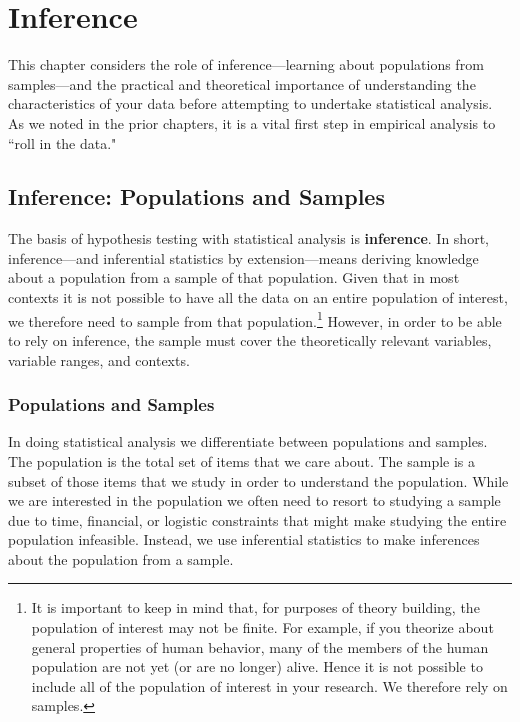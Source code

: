 \documentclass[11pt,openany]{book}\usepackage[]{graphicx}\usepackage[]{color}
\begin{document}
{\chapter{Inference}


This chapter considers the role of inference---learning about populations from samples---and the practical and theoretical importance of understanding the characteristics of your data before attempting to undertake statistical analysis. As we noted in the prior chapters, it is a vital first step in empirical analysis to ``roll in the data."

\section{Inference: Populations and Samples}

The basis of hypothesis testing with statistical analysis is \textbf{inference}. In short, inference---and inferential statistics by extension---means deriving knowledge about a population from a sample of that population. Given that in most contexts it is not possible to have all the data on an entire population of interest, we therefore need to sample from that population.\footnote{It is important to keep in mind that, for purposes of theory building, the population of interest may not be finite. For example, if you theorize about general properties of human behavior, many of the members of the human population are not yet (or are no longer) alive. Hence it is not possible to include all of the population of interest in your research. We therefore rely on samples.} However, in order to be able to rely on inference, the sample must cover the theoretically relevant variables, variable ranges, and contexts. 

\subsection{Populations and Samples} 

In doing statistical analysis we differentiate between populations and samples.  The population is the total set of items that we care about.  The sample is a subset of those items that we study in order to understand the population.  While we are interested in the population we often need to resort to studying a sample due to time, financial, or logistic constraints that might make studying the entire population infeasible. Instead, we use inferential statistics to make inferences about the population from a sample.

}
\end{document}
